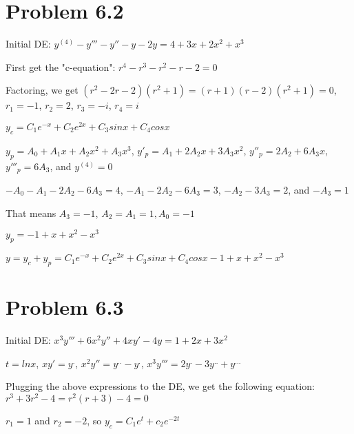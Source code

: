 \documentclass{article}
\begin{document}

\section{Problem 6.2}

\noindent Initial DE: $y^{(4)} - y''' - y'' - y - 2y = 4 + 3x + 2x^{2} + x^{3}$ \par
\noindent First get the "c-equation": $r^{4} - r^{3} - r^{2} - r - 2 = 0$ \par
\noindent Factoring, we get $(r^{2} - 2r - 2)(r^{2} + 1) = (r + 1)(r - 2)(r^{2} + 1) = 0$, $r_{1} = -1$, $r_{2} = 2$, $r_{3} = -i$, $r_{4} = i$ \par
\noindent $y_{c} = C_{1}e^{-x} + C_{2}e^{2x} + C_{3}sinx + C_{4}cosx$ \par\vspace{0.25cm}

\noindent $y_{p} = A_{0} + A_{1}x + A_{2}x^{2} + A_{3}x^{3}$, $y'_{p} = A_{1} + 2A_{2}x + 3A_{3}x^{2}$, $y''_{p} = 2A_{2} + 6A_{3}x$, $y'''_{p} = 6A_{3}$, and $y^{(4)} = 0$ \par\vspace{0.25cm}
\noindent $-A_{0} - A_{1} - 2A_{2} - 6A_{3} = 4$, $-A_{1} - 2A_{2} - 6A_{3} = 3$, $-A_{2} - 3A_{3} = 2$, and $-A_{3} = 1$

\noindent That means $A_{3} = -1$, $A_{2} = A_{1} = 1, A_{0} = -1$ \par
\noindent $y_{p} = -1 + x + x^{2} - x^{3}$ \par

\noindent $y = y_{c} + y_{p} = C_{1}e^{-x} + C_{2}e^{2x} + C_{3}sinx + C_{4}cosx -1 + x + x^{2} - x^{3}$

\section{Problem 6.3}

\noindent Initial DE: $x^{3}y''' + 6x^{2}y'' + 4xy' - 4y = 1 + 2x + 3x^{2}$ \par
\noindent $t = lnx$, $xy' = y^{.}$, $x^{2}y'' = y^{..} - y^{.}$, $x^{3}y''' = 2y^{.} - 3y^{..} + y^{...}$ \par\vspace{0.25cm}

\noindent Plugging the above expressions to the DE, we get the following equation: $r^{3} + 3r^{2} - 4 = r^{2}(r + 3) - 4 = 0$ \par
\noindent $r_{1} = 1$ and $r_{2} = -2$, so $y_{c} = C_{1}e^{t} + c_{2}e^{-2t}$ \par\vspace{0.25cm}
\end{document}
